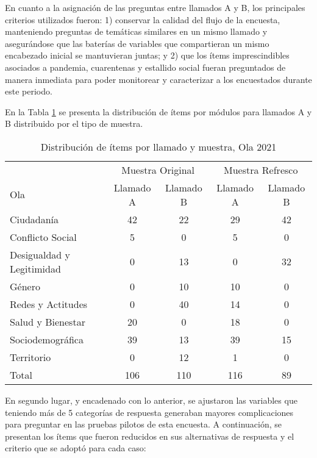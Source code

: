 \documentclass[
  12pt,
]{article}
\begin{document}
En cuanto a la asignación de las preguntas entre llamados A y B, los principales criterios utilizados fueron: 1) conservar la calidad del flujo de la encuesta, manteniendo preguntas de temáticas similares en un mismo llamado y asegurándose que las baterías de variables que compartieran un mismo encabezado inicial se mantuvieran juntas; y 2) que los ítems imprescindibles asociados a pandemia, cuarentenas y estallido social fueran preguntados de manera inmediata para poder monitorear y caracterizar a los encuestados durante este periodo.

En la Tabla \ref{tab:tabla-llamados} se presenta la distribución de ítems por módulos para llamados A y B distribuido por el tipo de muestra.

\begin{table}[H]

\caption{\label{tab:tabla-llamados}Distribución de ítems por llamado y muestra, Ola 2021}
\centering
\begin{tabular}[t]{lcccc}
\toprule
\multicolumn{1}{c}{ } & \multicolumn{2}{c}{Muestra Original} & \multicolumn{2}{c}{Muestra Refresco} \\
\cmidrule(l{3pt}r{3pt}){2-3} \cmidrule(l{3pt}r{3pt}){4-5}
Ola & Llamado A & Llamado B & Llamado A & Llamado B\\
\midrule
Ciudadanía & 42 & 22 & 29 & 42\\
Conflicto Social & 5 & 0 & 5 & 0\\
Desigualdad y Legitimidad & 0 & 13 & 0 & 32\\
Género & 0 & 10 & 10 & 0\\
Redes y Actitudes & 0 & 40 & 14 & 0\\
\addlinespace
Salud y Bienestar & 20 & 0 & 18 & 0\\
Sociodemográfica & 39 & 13 & 39 & 15\\
Territorio & 0 & 12 & 1 & 0\\
Total & 106 & 110 & 116 & 89\\
\bottomrule
\end{tabular}
\end{table}

En segundo lugar, y encadenado con lo anterior, se ajustaron las variables que teniendo más de 5 categorías de respuesta generaban mayores complicaciones para preguntar en las pruebas pilotos de esta encuesta. A continuación, se presentan los ítems que fueron reducidos en sus alternativas de respuesta y el criterio que se adoptó para cada caso:
\end{document}
